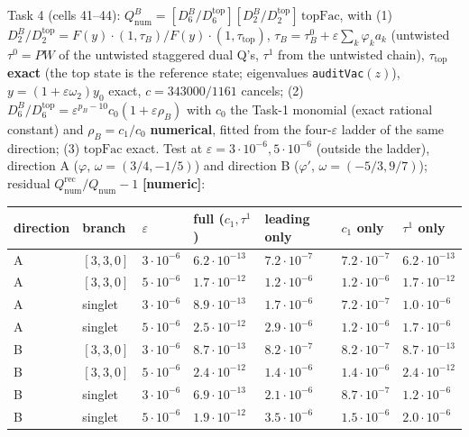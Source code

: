 \documentclass[10pt]{article}
\newcommand{\nb}[1]{\texttt{#1}}
\begin{document}
Task 4 (cells 41--44): $Q_{\mathrm{num}}^B=[D_6^B/D_6^{\mathrm{top}}][D_2^B/D_2^{\mathrm{top}}]\,\mathrm{topFac}$, with (1) $D_2^B/D_2^{\mathrm{top}}=F(y)\cdot(1,\tau_B)/F(y)\cdot(1,\tau_{\mathrm{top}})$, $\tau_B=\tau^0_B+\varepsilon\sum_k\varphi_ka_k$ (untwisted $\tau^0=PW$ of the untwisted staggered dual Q's, $\tau^1$ from the untwisted chain), $\tau_{\mathrm{top}}$ \textbf{exact} (the top state is the reference state; eigenvalues \nb{auditVac}$(z)$), $y=(1+\varepsilon\omega_2)y_0$ exact, $c=343000/1161$ cancels; (2) $D_6^B/D_6^{\mathrm{top}}=\varepsilon^{p_B-10}c_0(1+\varepsilon\rho_B)$ with $c_0$ the Task-1 monomial (exact rational constant) and $\rho_B=c_1/c_0$ \textbf{numerical}, fitted from the four-$\varepsilon$ ladder of the same direction; (3) $\mathrm{topFac}$ exact. Test at $\varepsilon=3\cdot10^{-6},5\cdot10^{-6}$ (outside the ladder), direction A ($\varphi$, $\omega=(3/4,-1/5)$) and direction B ($\varphi'$, $\omega=(-5/3,9/7)$); residual $Q_{\mathrm{num}}^{\mathrm{rec}}/Q_{\mathrm{num}}-1$ \textbf{[numeric]}:

\begin{center}\small\setlength{\tabcolsep}{3pt}\begin{longtable}{@{}lllllll@{}}\toprule
\textbf{direction} & \textbf{branch} & \textbf{$\varepsilon$} & \textbf{full ($c_1,\tau^1$)} & \textbf{leading only} & \textbf{$c_1$ only} & \textbf{$\tau^1$ only} \\\midrule\endhead
A & $[3,3,0]$ & $3\cdot10^{-6}$ & $6.2\cdot10^{-13}$ & $7.2\cdot10^{-7}$ & $7.2\cdot10^{-7}$ & $6.2\cdot10^{-13}$ \\
A & $[3,3,0]$ & $5\cdot10^{-6}$ & $1.7\cdot10^{-12}$ & $1.2\cdot10^{-6}$ & $1.2\cdot10^{-6}$ & $1.7\cdot10^{-12}$ \\
A & singlet & $3\cdot10^{-6}$ & $8.9\cdot10^{-13}$ & $1.7\cdot10^{-6}$ & $7.2\cdot10^{-7}$ & $1.0\cdot10^{-6}$ \\
A & singlet & $5\cdot10^{-6}$ & $2.5\cdot10^{-12}$ & $2.9\cdot10^{-6}$ & $1.2\cdot10^{-6}$ & $1.7\cdot10^{-6}$ \\
B & $[3,3,0]$ & $3\cdot10^{-6}$ & $8.7\cdot10^{-13}$ & $8.2\cdot10^{-7}$ & $8.2\cdot10^{-7}$ & $8.7\cdot10^{-13}$ \\
B & $[3,3,0]$ & $5\cdot10^{-6}$ & $2.4\cdot10^{-12}$ & $1.4\cdot10^{-6}$ & $1.4\cdot10^{-6}$ & $2.4\cdot10^{-12}$ \\
B & singlet & $3\cdot10^{-6}$ & $6.9\cdot10^{-13}$ & $2.1\cdot10^{-6}$ & $8.7\cdot10^{-7}$ & $1.2\cdot10^{-6}$ \\
B & singlet & $5\cdot10^{-6}$ & $1.9\cdot10^{-12}$ & $3.5\cdot10^{-6}$ & $1.5\cdot10^{-6}$ & $2.0\cdot10^{-6}$ \\
\bottomrule\end{longtable}\end{center}
\end{document}
